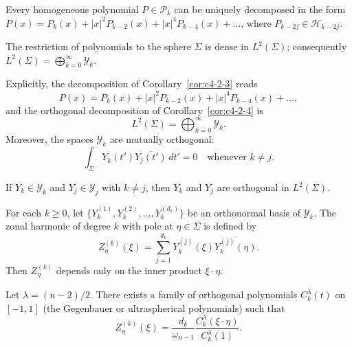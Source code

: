 \begin{corollary}\label{cor:c4-2-3}
Every homogeneous polynomial $P \in \mathcal{P}_k$ can be uniquely decomposed in the form $P(x) = P_k(x) + |x|^2 P_{k-2}(x) + |x|^4 P_{k-4}(x) + \dots$, where $P_{k-2j} \in \mathcal{H}_{k-2j}$.
\end{corollary}

\begin{corollary}\label{cor:c4-2-4}
The restriction of polynomials to the sphere $\Sigma$ is dense in $L^2(\Sigma)$; consequently $L^2(\Sigma) = \bigoplus_{k=0}^\infty \mathcal{Y}_k$.
\end{corollary}

Explicitly, the decomposition of Corollary~\ref{cor:c4-2-3} reads
\begin{equation}\label{eq:c4-2-5}
P(x) = P_k(x) + |x|^2 P_{k-2}(x) + |x|^4 P_{k-4}(x) + \dots,
\end{equation}
and the orthogonal decomposition of Corollary~\ref{cor:c4-2-4} is
\begin{equation}\label{eq:c4-2-6}
L^2(\Sigma) = \bigoplus_{k=0}^\infty \mathcal{Y}_k.
\end{equation}
Moreover, the spaces $\mathcal{Y}_k$ are mutually orthogonal:
\begin{equation}\label{eq:c4-2-7}
\int_\Sigma Y_k(t') \overline{Y_j(t')}\,dt' = 0 \quad \text{whenever } k \neq j.
\end{equation}

\begin{lemma}\label{lem:c4-2-8}
If $Y_k \in \mathcal{Y}_k$ and $Y_j \in \mathcal{Y}_j$ with $k \neq j$, then $Y_k$ and $Y_j$ are orthogonal in $L^2(\Sigma)$.
\end{lemma}

\begin{corollary}\label{cor:c4-2-9}
For each $k \geq 0$, let $\{Y_k^{(1)}, Y_k^{(2)}, \dots, Y_k^{(d_k)}\}$ be an orthonormal basis of $\mathcal{Y}_k$. The zonal harmonic of degree $k$ with pole at $\eta \in \Sigma$ is defined by
\[
Z_\eta^{(k)}(\xi) = \sum_{j=1}^{d_k} Y_k^{(j)}(\xi) \overline{Y_k^{(j)}(\eta)}.
\]
Then $Z_\eta^{(k)}$ depends only on the inner product $\xi \cdot \eta$.
\end{corollary}

\begin{theorem}\label{thm:c4-2-10}
Let $\lambda = (n-2)/2$. There exists a family of orthogonal polynomials $C_k^\lambda(t)$ on $[-1, 1]$ (the Gegenbauer or ultraspherical polynomials) such that
\[
Z_\eta^{(k)}(\xi) = \frac{d_k}{\omega_{n-1}} \frac{C_k^\lambda(\xi \cdot \eta)}{C_k^\lambda(1)}.
\]
\end{theorem}


